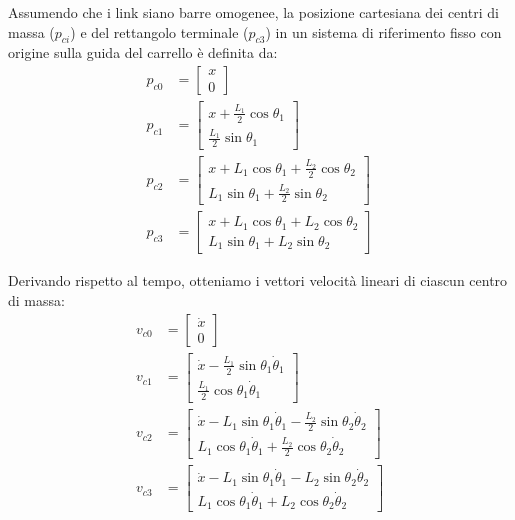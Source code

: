 \documentclass[11pt,a4paper]{article}
\begin{document}
	Assumendo che i link siano barre omogenee, la posizione cartesiana dei centri di massa ($p_{ci}$) e del rettangolo terminale ($p_{c3}$) in un sistema di riferimento fisso con origine sulla guida del carrello è definita da:
	\begin{align}
		p_{c0} &= \begin{bmatrix} x \\ 0 \end{bmatrix} \\
		p_{c1} &= \begin{bmatrix} x + \frac{L_1}{2}\cos\theta_1 \\ \frac{L_1}{2}\sin\theta_1 \end{bmatrix} \\
		p_{c2} &= \begin{bmatrix} x + L_1\cos\theta_1 + \frac{L_2}{2}\cos\theta_2 \\ L_1\sin\theta_1 + \frac{L_2}{2}\sin\theta_2 \end{bmatrix} \\
		p_{c3} &= \begin{bmatrix} x + L_1\cos\theta_1 + L_2\cos\theta_2 \\ L_1\sin\theta_1 + L_2\sin\theta_2 \end{bmatrix}
	\end{align}
	
	Derivando rispetto al tempo, otteniamo i vettori velocità lineari di ciascun centro di massa:
	\begin{align}
		v_{c0} &= \begin{bmatrix} \dot{x} \\ 0 \end{bmatrix} \\
		v_{c1} &= \begin{bmatrix} \dot{x} - \frac{L_1}{2}\sin\theta_1 \dot{\theta}_1 \\ \frac{L_1}{2}\cos\theta_1 \dot{\theta}_1 \end{bmatrix} \\
		v_{c2} &= \begin{bmatrix} \dot{x} - L_1\sin\theta_1 \dot{\theta}_1 - \frac{L_2}{2}\sin\theta_2 \dot{\theta}_2 \\ L_1\cos\theta_1 \dot{\theta}_1 + \frac{L_2}{2}\cos\theta_2 \dot{\theta}_2 \end{bmatrix} \\
		v_{c3} &= \begin{bmatrix} \dot{x} - L_1\sin\theta_1 \dot{\theta}_1 - L_2\sin\theta_2 \dot{\theta}_2 \\ L_1\cos\theta_1 \dot{\theta}_1 + L_2\cos\theta_2 \dot{\theta}_2 \end{bmatrix}
	\end{align}
	
\end{document}
